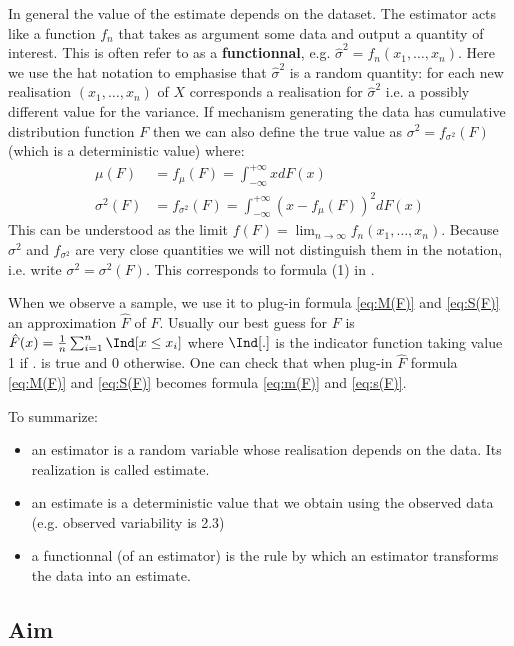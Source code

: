\documentclass[12pt]{article}
\begin{document}
In general the value of the estimate depends on the dataset. The
estimator acts like a function \(f_n\) that takes as argument some
data and output a quantity of interest. This is often refer to as a
\textbf{functionnal}, e.g. \(\hat{\sigma}^2=f_n(x_1,\ldots,x_n)\). Here we
use the hat notation to emphasise that \(\hat{\sigma}^2\) is a random
quantity: for each new realisation \((x_1,\ldots,x_n)\) of \(X\)
corresponds a realisation for \(\hat{\sigma}^2\) i.e. a possibly
different value for the variance. If mechanism generating the data has
cumulative distribution function \(F\) then we can also define the
true value as \(\sigma^2=f_{\sigma^2}(F)\) (which is a deterministic
value) where:
\begin{align}
\mu(F) &= f_\mu(F) = \int_{-\infty}^{+\infty} x dF(x) \label{eq:M(F)}\\
\sigma^2(F) &= f_{\sigma^2}(F) = \int_{-\infty}^{+\infty} (x - f_\mu(F))^2 dF(x) \label{eq:S(F)}
\end{align}
This can be understood as the limit \(f(F)=\lim_{n \rightarrow \infty}
f_n(x_1,\ldots,x_n)\). Because \(\sigma^2\) and \(f_{\sigma^2}\) are
very close quantities we will not distinguish them in the notation,
i.e. write \(\sigma^2=\sigma^2(F)\). This corresponds to formula (1)
in \cite{lee1990u}. 

\bigskip

When we observe a sample, we use it to plug-in formula \eqref{eq:M(F)}
and \eqref{eq:S(F)} an approximation \(\hat{F}\) of \(F\). Usually our
best guess for \(F\) is \(\hat{F}(x)= \frac{1}{n}\sum_{i=1}^n
\Ind[x \leq x_i]\) where \(\Ind[.]\) is the indicator function taking value
1 if \(.\) is true and 0 otherwise. One can check that when plug-in
\(\hat{F}\) formula \eqref{eq:M(F)} and \eqref{eq:S(F)} becomes formula
\eqref{eq:m(F)} and \eqref{eq:s(F)}.

\bigskip

To summarize:
\begin{itemize}
\item an estimator is a random variable whose realisation depends on the
data. Its realization is called estimate.
\item an estimate is a deterministic value that we obtain using the
observed data (e.g. observed variability is 2.3)
\item a functionnal (of an estimator) is the rule by which an estimator
transforms the data into an estimate.
\end{itemize}

\subsection{Aim}
\label{sec:orgcf171a9}
\end{document}

